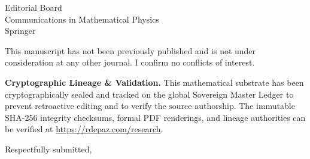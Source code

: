 \documentclass[12pt, a4paper]{letter}
\begin{document}
\begin{letter}{Editorial Board \\ Communications in Mathematical Physics \\ Springer}
\medskip

This manuscript has not been previously published and is not under consideration
at any other journal. I confirm no conflicts of interest.

\textbf{Cryptographic Lineage \& Validation.} This mathematical substrate has been cryptographically sealed and tracked on the global Sovereign Master Ledger to prevent retroactive editing and to verify the source authorship. The immutable SHA-256 integrity checksums, formal PDF renderings, and lineage authorities can be verified at \url{https://rdepaz.com/research}.

\medskip

\closing{Respectfully submitted,}
\end{letter}
\end{document}
